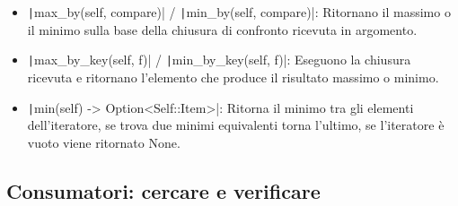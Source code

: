 \begin{itemize}
  \item \texttt|max_by(self, compare)| / \texttt|min_by(self, compare)|: Ritornano il massimo o il minimo sulla base della chiusura di confronto ricevuta in argomento.
  \item \texttt|max_by_key(self, f)| / \texttt|min_by_key(self, f)|: Eseguono la chiusura ricevuta e ritornano l'elemento che produce il risultato massimo o minimo.
  \item \texttt|min(self) -> Option<Self::Item>|: Ritorna il minimo tra gli elementi dell'iteratore, se trova due minimi equivalenti torna l'ultimo, se l'iteratore è vuoto viene ritornato None.
\end{itemize}


\subsection{Consumatori: cercare e verificare}

